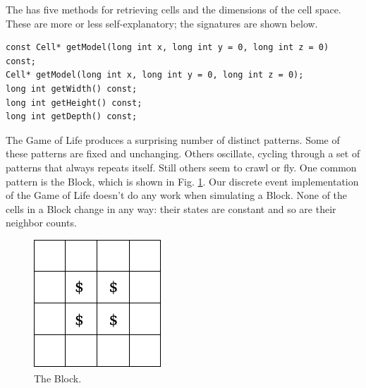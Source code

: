 The  has five methods for retrieving cells and the dimensions of the cell space. These are more or less self-explanatory; the signatures are shown below.
\begin{verbatim}
const Cell* getModel(long int x, long int y = 0, long int z = 0) const;
Cell* getModel(long int x, long int y = 0, long int z = 0);
long int getWidth() const;
long int getHeight() const;
long int getDepth() const;
\end{verbatim}

The Game of Life produces a surprising number of distinct patterns. Some of these patterns are fixed and unchanging. Others oscillate, cycling through a set of patterns that always repeats itself. Still others seem to crawl or fly. One common pattern is the Block, which is shown in Fig. \ref{fig:gol_block}. Our discrete event implementation of the Game of Life doesn't do any work when simulating a Block. None of the cells in a Block change in any way: their states are constant and so are their neighbor counts.
\begin{figure}[ht]
\centering
\includegraphics{network_models_figs/block_pattern.pdf}
\caption{The Block.}
\label{fig:gol_block}
\end{figure}

